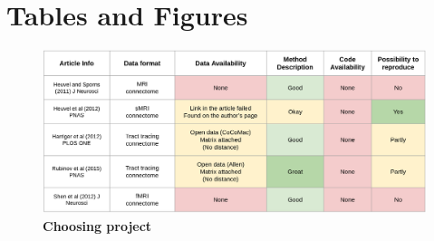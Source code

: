 \documentclass{article}
\begin{document}



\newpage
\section*{Tables and Figures}

\begin{figure}
  \centering
  \includegraphics[width=1.1\textwidth,center]{table1}
  \caption{\textbf{Choosing project}}
  \label{fig:table1}
\end{figure}
\end{document}
